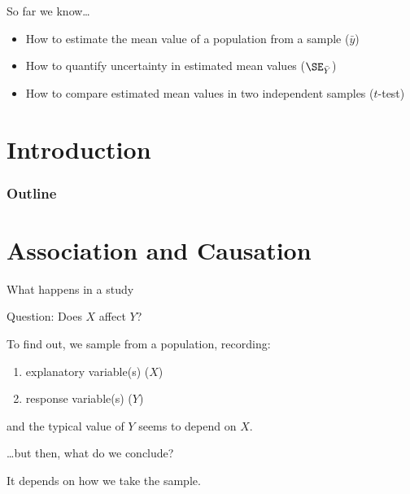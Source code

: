 
\subtitle{and One--sided $t$-tests}

\date{17 October 2013}




\begin{frame}
  \maketitle
\end{frame}

\begin{frame}{So far we know\ldots}

    \begin{itemize}
        \item How to estimate the mean value of a population from a sample ($\bar y$)
        \item How to quantify uncertainty in estimated mean values ($\SE_{\bar Y}$)
        \item How to compare estimated mean values in two independent samples ($t$-test)
    \end{itemize}

\end{frame}

\section*{Introduction}
\begin{frame}\frametitle<presentation>{Outline}
  \tableofcontents
\end{frame}


\section{Association and Causation}

\begin{frame}{What happens in a study}

    \alert{Question:} Does $X$ affect $Y$?

    \vspace{2em}

    To find out, we sample from a population, recording:
      \begin{enumerate}
          \item explanatory variable(s) ($X$)
          \item response variable(s) ($Y$)
      \end{enumerate}
    and the typical value of $Y$ seems to depend on $X$.

    \vspace{2em}

    \ldots but then, what do we conclude?

    \vspace{2em}

    \alert{It depends} on how we take the sample.

\end{frame}

